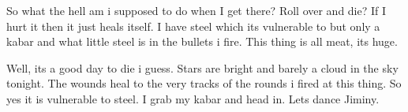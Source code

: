 So what the hell am i supposed to do when I get there? Roll over and die? If I hurt it then it just heals itself. I have steel which its vulnerable to but only a kabar and what little steel is in the bullets i fire. This thing is all meat, its huge.

Well, its a good day to die i guess. Stars are bright and barely a cloud in the sky tonight. The wounds heal to the very tracks of the rounds i fired at this thing. So yes it is vulnerable to steel. I grab my kabar and head in. Lets dance Jiminy.



